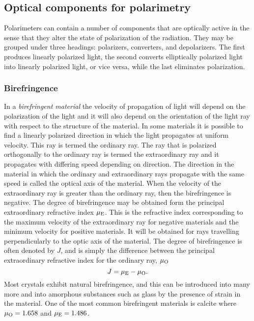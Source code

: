 \documentclass{article}
\begin{document}
\subsection{Optical components for polarimetry}

Polarimeters can contain a number of components that are optically active in the sense
that they alter the state of polarization of the radiation. They may be grouped under
three headings: polarizers, converters, and depolarizers. The first produces linearly 
polarized light, the second converts elliptically polarized light into linearly polarized light, or vice versa, while the last eliminates polarization. 

\subsubsection{Birefringence}

In a {\it birefringent material} the velocity of propagation of light will depend on the polarization of the light and it will also depend on the orientation of the light ray 
with respect to the structure of the material. In some materials it is possible to find 
a linearly polarized direction in which the light propagates at uniform velocity. This ray
is termed the ordinary ray. The ray that is polarized orthogonally to the ordinary ray is
termed the extraordinary ray and it propagates with differing speed depending on direction. The direction in the material in which the ordinary and extraordinary rays propagate with the same speed is called the optical axis of the material. When the 
velocity of the extraordinary ray is greater than the ordinary ray, then the birefringence is negative. The degree of birefringence may be obtained form the principal extraordinary 
refractive index $\mu_{\rm E}$. This is the refractive index corresponding to the maximum
velocity of the extraordinary ray for negative materials and the minimum velocity for
positive materials. It will be obtained for rays travelling perpendicularly to the optic axis of the material. The degree of birefringence is often denoted by $J$, and is simply the
difference between the principal extraordinary refractive index for the ordinary ray, $\mu_{\rm O}$
\[
J=\mu_{\rm E}-\mu_{\rm O}.
\]
\noindent
Most crystals exhibit natural birefringence, and this can be introduced into many more
and into amorphous substances such as glass by the presence of strain in the material. One of the most common birefringent materials is calcite where $\mu_{\rm O}=1.658$ and $\mu_{\rm E}=1.486$.
\end{document}
